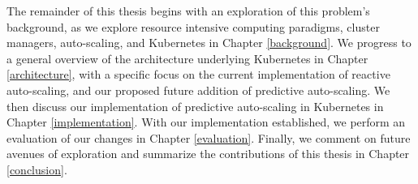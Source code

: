 The remainder of this thesis begins with an exploration of this problem's
background, as we explore resource intensive computing paradigms, cluster
managers, auto-scaling, and Kubernetes in Chapter \ref{background}.
We progress to a general overview of the
architecture underlying Kubernetes in Chapter \ref{architecture},
with a specific focus on the current
implementation of reactive auto-scaling, and our proposed future addition of
predictive auto-scaling. We then discuss our implementation of predictive
auto-scaling in Kubernetes in Chapter \ref{implementation}.
With our implementation established, we perform an
evaluation of our changes in Chapter \ref{evaluation}.
Finally, we comment on future avenues of exploration
and summarize the contributions of this thesis in Chapter \ref{conclusion}.
